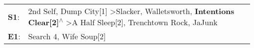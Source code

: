 \begin{supertabular}{p{0.03\textwidth}p{0.92\textwidth}}
 \textbf{S1}:  &  2nd Self\textsuperscript{}, \enspace Dump City[1]\textsuperscript{} \textgreater \enspace Slacker\textsuperscript{}, \enspace Walletsworth\textsuperscript{}, \enspace \textbf{Intentions Clear[2]\textsuperscript{$\wedge$}} \textgreater \enspace A Half Sleep[2]\textsuperscript{}, \enspace Trenchtown Rock\textsuperscript{}, \enspace JaJunk\textsuperscript{}  \enspace  \\
 \textbf{E1}:  &                                                                                                                                                                                                                                                                                                   Search 4\textsuperscript{}, \enspace Wife Soup[2]\textsuperscript{}  \enspace  \\
\end{supertabular}
